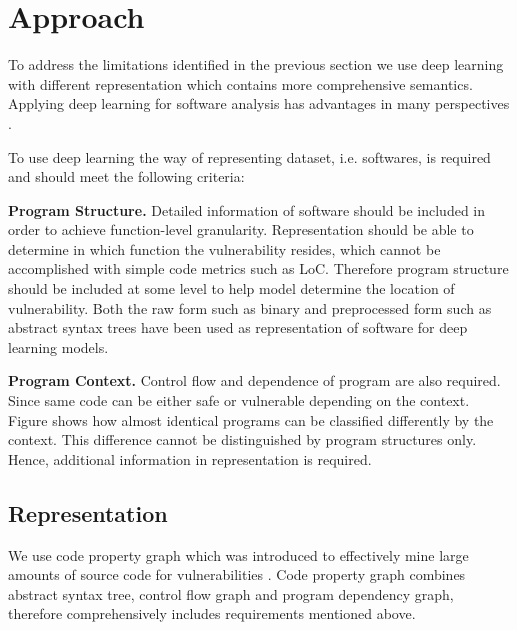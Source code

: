 \section{Approach}

To address the limitations identified in the previous section we use deep learning with different representation which contains more comprehensive semantics.
Applying deep learning for software analysis has advantages in many perspectives \cite{shin2015recognizing}.

To use deep learning the way of representing dataset, i.e. softwares, is required and should meet the following criteria:

\textbf{Program Structure.} Detailed information of software should be included in order to achieve function-level granularity.
Representation should be able to determine in which function the vulnerability resides, which cannot be accomplished with simple code metrics such as LoC.
Therefore program structure should be included at some level to help model determine the location of vulnerability.
Both the raw form such as binary \cite{shin2015recognizing, kosmidis2017machine} and preprocessed form such as abstract syntax trees \cite{wang2016automatically}
have been used as representation of software for deep learning models.

\textbf{Program Context.} Control flow and dependence of program are also required. Since same code can be either safe or vulnerable depending on the context.
Figure shows how almost identical programs can be classified differently by the context.
This difference cannot be distinguished by program structures only. Hence, additional information in representation is required.

\subsection{Representation}
We use code property graph which was introduced to effectively mine large amounts of source code for vulnerabilities \cite{yamaguchi2014modeling}.
Code property graph combines abstract syntax tree, control flow graph and program dependency graph, therefore comprehensively includes requirements mentioned above.



